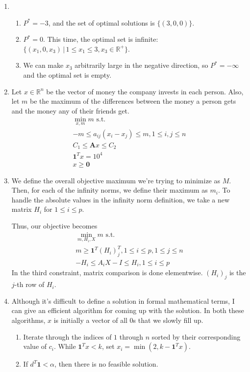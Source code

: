 \documentclass[12pt]{article}
\begin{document}
\begin{enumerate}
      \item \begin{enumerate}
                  \item $P^*=-3$, and the set of optimal solutions is $\{(3, 0, 0)\}$.
                  \item $P^*=0$. This time, the optimal set is infinite:
                  $\{(x_1, 0, x_3)\,|\,1 \le x_1 \le 3, x_3 \in \mathbb{R}^+\}$.
                  \item We can make $x_3$ arbitrarily large in the negative direction, so $P^*=-\infty$
                  and the optimal set is empty.
            \end{enumerate}
      \item Let $x \in \mathbb{R}^n$ be the vector of money the company invests in each person.
            Also, let $m$ be the maximum of the differences between the money a person gets and the money any of their friends get.
            \begin{gather*}
                  \min_{x, m} m\text{ s.t.} \\
                  -m \le a_{ij}(x_i-x_j) \le m, 1 \le i, j \le n \\
                  C_1 \le \mathbf{A}x \le C_2 \\
                  \mathbf{1}^T x = 10^4 \\
                  x \ge \mathbf{0}
            \end{gather*}
      \item We define the overall objective maximum we're trying to minimize as $M$.
            Then, for each of the infinity norms, we define their maximum as $m_{i}$.
            To handle the absolute values in the infinity norm definition, we take
            a new matrix $H_i$ for $1 \le i \le p$.

            Thus, our objective becomes
            \begin{gather*}
                  \min_{m, H_i, X} m\text{ s.t.} \\
                  m \ge \mathbf{1}^T (H_i)_j^T, 1 \le i \le p, 1 \le j \le n \\
                  -H_i \le A_iX-I \le H_i, 1 \le i \le p
            \end{gather*}
            In the third constraint, matrix comparison is done elementwise.
            $(H_i)_j$ is the $j$-th row of $H_i$.
      \item Although it's difficult to define a solution in formal mathematical terms,
            I can give an efficient algorithm for coming up with the solution.
            In both these algorithms, $x$ is initially a vector of all $0$s that we slowly fill up.
            \begin{enumerate}[label=\roman*.]
                  \item Iterate through the indices of $1$ through $n$ sorted by their corresponding value of $c_i$.
                        While $\mathbf{1}^T x < k$, set $x_i=\min(2, k-\mathbf{1}^Tx)$.
                  \item If $d^T \mathbf{1} < \alpha$, then there is no feasible solution.


\end{enumerate}
\end{enumerate}
\end{document}

